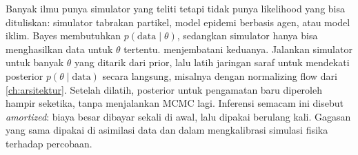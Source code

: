 Banyak ilmu punya simulator yang teliti tetapi tidak punya likelihood yang bisa dituliskan: simulator tabrakan
partikel, model epidemi berbasis agen, atau model iklim. Bayes membutuhkan $p(\text{data}\mid\theta)$, sedangkan
simulator hanya bisa menghasilkan data untuk $\theta$ tertentu.  \citep{cranmer2020sbi}
menjembatani keduanya. Jalankan simulator untuk banyak $\theta$ yang ditarik dari prior, lalu latih jaringan saraf untuk
mendekati posterior $p(\theta\mid\text{data})$ secara langsung, misalnya dengan normalizing flow dari \cref{ch:arsitektur}.
Setelah dilatih, posterior untuk pengamatan baru diperoleh hampir seketika, tanpa menjalankan MCMC lagi. Inferensi
semacam ini disebut \emph{amortized}: biaya besar dibayar sekali di awal, lalu dipakai berulang kali. Gagasan yang sama
dipakai di asimilasi data dan dalam mengkalibrasi simulasi fisika terhadap percobaan.


